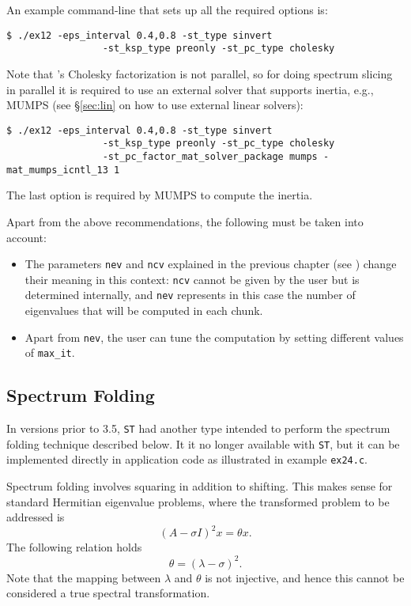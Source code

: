 An example command-line that sets up all the required options is:
\begin{Verbatim}[fontsize=\small]
	$ ./ex12 -eps_interval 0.4,0.8 -st_type sinvert
                 -st_ksp_type preonly -st_pc_type cholesky
\end{Verbatim}

Note that \petsc's Cholesky factorization is not parallel, so for doing spectrum slicing in parallel it is required to use an external solver that supports inertia, e.g., MUMPS (see \S\ref{sec:lin} on how to use external linear solvers):
\begin{Verbatim}[fontsize=\small]
	$ ./ex12 -eps_interval 0.4,0.8 -st_type sinvert
                 -st_ksp_type preonly -st_pc_type cholesky
                 -st_pc_factor_mat_solver_package mumps -mat_mumps_icntl_13 1
\end{Verbatim}
The last option is required by MUMPS to compute the inertia.

Apart from the above recommendations, the following must be taken into account:
\begin{itemize}
\setlength{\itemsep}{0pt}
\item The parameters \texttt{nev} and \texttt{ncv} explained in the previous chapter (see ) change their meaning in this context: \texttt{ncv} cannot be given by the user but is determined internally, and \texttt{nev} represents in this case the number of eigenvalues that will be computed in each chunk.
\item Apart from \texttt{nev}, the user can tune the computation by setting different values of \texttt{max\_it}.
\end{itemize}

\subsection{Spectrum Folding}

In \slepc versions prior to 3.5, \texttt{ST} had another type intended to perform the spectrum folding technique described below. It it no longer available with \texttt{ST}, but it can be implemented directly in application code as illustrated in example \texttt{ex24.c}.

Spectrum folding involves squaring in addition to shifting. This makes sense for standard Hermitian eigenvalue problems, where the transformed problem to be addressed is
\begin{equation}(A-\sigma I)^2x=\theta x.\end{equation}
The following relation holds 
\begin{equation}\theta=(\lambda-\sigma)^2.\end{equation}
Note that the mapping between $\lambda$ and $\theta$ is not injective, and hence this cannot be considered a true spectral transformation.

